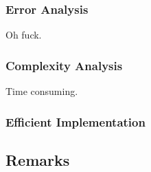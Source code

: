 \documentclass[12pt]{article}
\begin{document}
\subsubsection{Error Analysis}
Oh fuck.

\subsubsection{Complexity Analysis}
Time consuming.

\subsubsection{Efficient Implementation}


\subsection{Remarks}



\printbibliography
\end{document}
